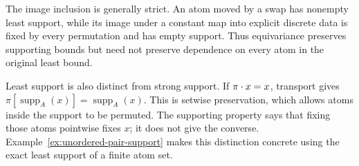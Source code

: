 The image inclusion is generally strict. An atom moved by a swap has
nonempty least support, while its image under a constant map into explicit
discrete data is fixed by every permutation and has empty support. Thus
equivariance preserves supporting bounds but need not preserve dependence
on every atom in the original least bound.

Least support is also distinct from strong support. If $\pi\mathbin{\cdot} x=x$,
transport gives
$\pi[\operatorname{supp}_A(x)]=\operatorname{supp}_A(x)$.
This is setwise preservation, which allows atoms inside the support to be
permuted. The supporting property says that fixing those atoms pointwise
fixes $x$; it does not give the converse.
Example~\ref{ex:unordered-pair-support} makes this distinction concrete using
the exact least support of a finite atom set.
